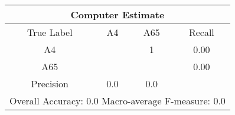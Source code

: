 \begin{tabular}{|c||c|c||c|}
\hline 
\multicolumn{4}{|c|}{Computer Estimate}\\
\hline 
True Label & A4 & A65 & Recall \\
\hline 
A4 &  &1 &  0.00\\
A65 &  & & 0.00\\
\hline 
Precision & 0.0 & 0.0 & \\
\hline 
\multicolumn{4}{|c|}{Overall Accuracy: 0.0 Macro-average F-measure: 0.0}\\
\hline 
\end{tabular} 

